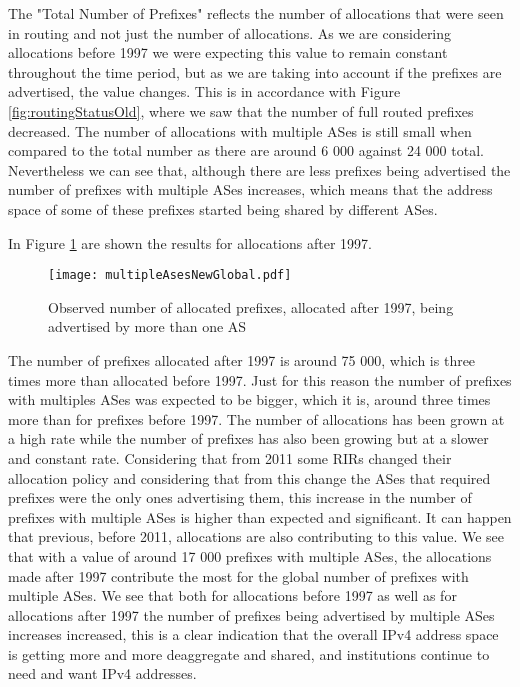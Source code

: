 \documentclass[11pt,a4paper]{scrreprt}
\begin{document}
The "Total Number of Prefixes" reflects the number of allocations that were seen in routing and not just the number of allocations. As we are considering allocations before 1997 we were expecting this value to remain constant throughout the time period, but as we are taking into account if the prefixes are advertised, the value changes. This is in accordance with Figure \ref{fig:routingStatusOld}, where we saw that the number of full routed prefixes decreased. 
The number of allocations with multiple ASes is still small when compared to the total number as there are around 6 000 against 24 000 total. Nevertheless we can see that, although there are less prefixes being advertised the number of prefixes with multiple ASes increases, which means that the address space of some of these prefixes started being shared by different ASes. 

In Figure \ref{fig:multipleAsesNewGlobal} are shown the results for allocations after 1997.

\begin{figure}[!h]
\centering
\texttt{[image: multipleAsesNewGlobal.pdf]}
\caption{Observed number of allocated prefixes, allocated after 1997, being advertised by more than one AS}
\label{fig:multipleAsesNewGlobal}
\end{figure}

The number of prefixes allocated after 1997 is around 75 000, which is three times more than allocated before 1997. Just for this reason the number of prefixes with multiples ASes was expected to be bigger, which it is, around three times more than for prefixes before 1997. The number of allocations has been grown at a high rate while the number of prefixes has also been growing but at a slower and constant rate. 
Considering that from 2011 some RIRs changed their allocation policy and considering that from this change the ASes that required prefixes were the only ones advertising them, this increase in the number of prefixes with multiple ASes is higher than expected and significant. It can happen that previous, before 2011, allocations are also contributing to this value. 
We see that with a value of around 17 000 prefixes with multiple ASes, the allocations made after 1997 contribute the most for the global number of prefixes with multiple ASes.  
We see that both for allocations before 1997 as well as for allocations after 1997 the number of prefixes being advertised by multiple ASes increases increased, this is a clear indication that the overall IPv4 address space is getting more and more deaggregate and shared, and institutions continue to need and want IPv4 addresses. 
\end{document}
